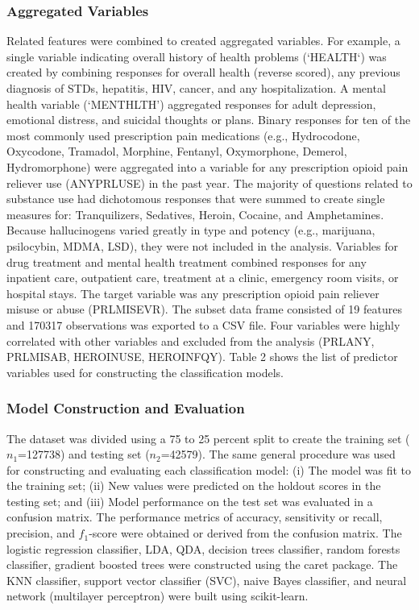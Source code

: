 \documentclass[sigconf]{acmart}
\begin{document}
\subsubsection{Aggregated Variables}

Related features were combined to created aggregated variables. For example, 
a single variable indicating overall history of health problems (`HEALTH`) 
was created by combining responses for overall health (reverse scored), any
previous diagnosis of STDs, hepatitis, HIV, cancer, and any hospitalization. 
A mental health variable (`MENTHLTH') aggregated responses for adult depression, 
emotional distress, and suicidal thoughts or plans. Binary responses for ten 
of the most commonly used prescription pain medications (e.g., Hydrocodone, 
Oxycodone, Tramadol, Morphine, Fentanyl, Oxymorphone, Demerol, Hydromorphone) 
were aggregated into a variable for any prescription opioid pain reliever use 
(ANYPRLUSE) in the past year. The majority of questions related to substance 
use had dichotomous responses that were summed to create single measures for: 
Tranquilizers, Sedatives, Heroin, Cocaine, and Amphetamines. Because 
hallucinogens varied greatly in type and potency (e.g., marijuana, psilocybin, 
MDMA, LSD), they were not included in the analysis. Variables for drug 
treatment and mental health treatment combined responses for any inpatient 
care, outpatient care, treatment at a clinic, emergency room visits, or 
hospital stays. The target variable was any prescription opioid pain reliever 
misuse or abuse (PRLMISEVR). The subset data frame consisted of 19 features 
and 170317 observations was exported to a CSV file. Four variables were highly 
correlated with other variables and excluded from the analysis (PRLANY, PRLMISAB, 
HEROINUSE, HEROINFQY). Table 2 shows the list of predictor variables used for 
constructing the classification models. 


\subsubsection{Model Construction and Evaluation}

The dataset was divided using a 75 to 25 percent split to create the training 
set ($n_1$=127738) and testing set ($n_2$=42579). The same general procedure 
was used for constructing and evaluating each classification model: (i) The 
model was fit to the training set; (ii) New values were predicted on the 
holdout scores in the testing set; and (iii) Model performance on the test 
set was evaluated in a confusion matrix. The performance metrics of accuracy, 
sensitivity or recall, precision, and $f_1$-score were obtained or derived 
from the confusion matrix. The logistic regression classifier, LDA, QDA, 
decision trees classifier, random forests classifier, gradient boosted trees 
were constructed using the caret package. The KNN classifier, support 
vector classifier (SVC), naive Bayes classifier, and neural network 
(multilayer perceptron) were built using scikit-learn. 
\end{document}
